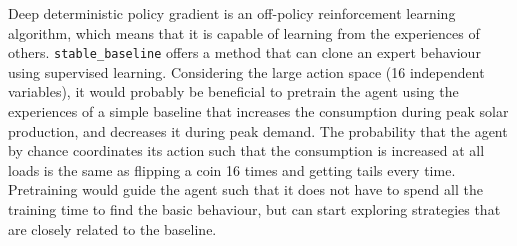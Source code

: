 \documentclass[class=book, crop=false, 11pt]{standalone}
\begin{document}
Deep deterministic policy gradient is an off-policy reinforcement learning algorithm, which means that it is capable of learning from the experiences of others. \texttt{stable\_baseline} offers a method that can clone an expert behaviour using supervised learning. Considering the large action space (16 independent variables), it would probably be beneficial to pretrain the agent using the experiences of a simple baseline that increases the consumption during peak solar production, and decreases it during peak demand. The probability that the agent by chance coordinates its action such that the consumption is increased at all loads is the same as flipping a coin 16 times and getting tails every time. Pretraining would guide the agent such that it does not have to spend all the training time to find the basic behaviour, but can start exploring strategies that are closely related to the baseline. 
\end{document}
